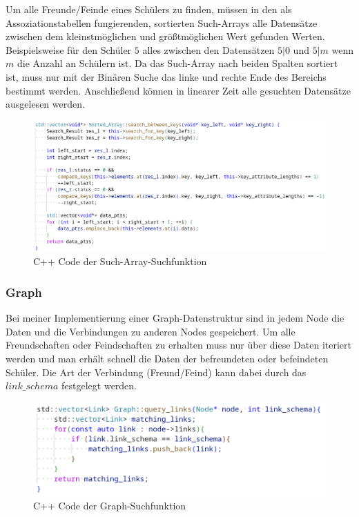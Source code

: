 \documentclass[11pt,a4paper]{article}
\begin{document}
Um alle Freunde/Feinde eines Schülers zu finden, müssen in
den als Assoziationstabellen fungierenden, sortierten Such-Arrays
alle Datensätze zwischen dem kleinstmöglichen und größtmöglichen Wert
gefunden Werten. Beispielsweise für den Schüler $5$ alles zwischen den Datensätzen
$5 | 0$ und $5 | m$ wenn $m$ die Anzahl an Schülern ist. Da das Such-Array
nach beiden Spalten sortiert ist, muss nur mit der Binären Suche das linke
und rechte Ende des Bereichs bestimmt werden. Anschließend können in linearer
Zeit alle gesuchten Datensätze ausgelesen werden.

\vspace*{0.5cm}

\begin{figure}[H]
    \centering
    \includegraphics[width=1.1\textwidth]{./res/code_sort_array.png}
    \caption{C++ Code der Such-Array-Suchfunktion}
\end{figure}

\subsubsection{Graph}

Bei meiner Implementierung einer Graph-Datenstruktur sind in jedem Node
die Daten und die Verbindungen zu anderen Nodes gespeichert.
Um alle Freundschaften oder Feindschaften zu erhalten muss nur über diese
Daten iteriert werden und man erhält schnell die Daten der befreundeten oder
befeindeten Schüler. Die Art der Verbindung (Freund/Feind) kann dabei durch
das $link\_schema$ festgelegt werden.

\vspace*{0.5cm}

\begin{figure}[H]
    \centering
    \includegraphics[width=1.0\textwidth]{./res/code_graphdb.png}
    \caption{C++ Code der Graph-Suchfunktion}
\end{figure}
\end{document}
